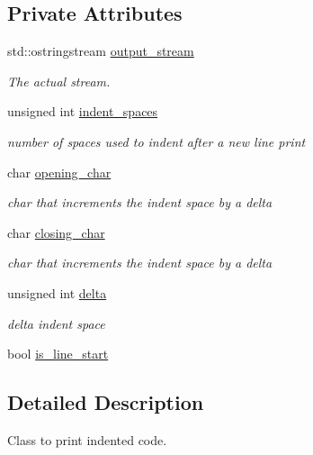 \subsection*{Private Attributes}
\begin{DoxyCompactItemize}
\item 
std\+::ostringstream \hyperlink{classIndentedOutputStream_a0d1bb62525852927c422a0734686902a}{output\+\_\+stream}
\begin{DoxyCompactList}\small\item\em The actual stream. \end{DoxyCompactList}\item 
unsigned int \hyperlink{classIndentedOutputStream_a92659187ef6887c07649ae881465ddc4}{indent\+\_\+spaces}
\begin{DoxyCompactList}\small\item\em number of spaces used to indent after a new line print \end{DoxyCompactList}\item 
char \hyperlink{classIndentedOutputStream_a7c0fd93cd1bf90d28b3791b61d6afdbd}{opening\+\_\+char}
\begin{DoxyCompactList}\small\item\em char that increments the indent space by a delta \end{DoxyCompactList}\item 
char \hyperlink{classIndentedOutputStream_a6cd40928cb1d7089072b57486c7f8d75}{closing\+\_\+char}
\begin{DoxyCompactList}\small\item\em char that increments the indent space by a delta \end{DoxyCompactList}\item 
unsigned int \hyperlink{classIndentedOutputStream_a11915e0d1ac091ecc3205d71ebc493b6}{delta}
\begin{DoxyCompactList}\small\item\em delta indent space \end{DoxyCompactList}\item 
bool \hyperlink{classIndentedOutputStream_ae7357f8c2e52afda355d4e240de611b4}{is\+\_\+line\+\_\+start}
\end{DoxyCompactItemize}


\subsection{Detailed Description}
Class to print indented code. 

